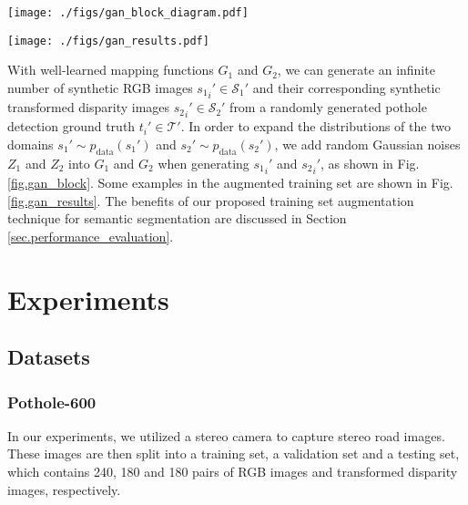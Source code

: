 \documentclass[runningheads]{llncs}
\begin{document}
\begin{figure*}[t]
    \centering
    \texttt{[image: ./figs/gan\_block\_diagram.pdf]}
    \caption{Adversarial domain adaptation for training set augmentation.}
    \label{fig.gan_block}
\end{figure*}

\begin{figure*}[t]
    \centering
    \texttt{[image: ./figs/gan\_results.pdf]}
    \caption{Examples of training set augmentation results: (a) randomly created pothole detection ground truth; (b) generated RGB images; and (c) generated transformed disparity images.}
    \label{fig.gan_results}
\end{figure*}

With well-learned mapping functions $G_1$ and $G_2$, we can generate an infinite number of synthetic RGB images ${{s_1}_i}'\in\mathcal{S}_1'$ and their corresponding synthetic transformed disparity images ${{s_2}_i}'\in\mathcal{S}_2'$ from a randomly generated pothole detection ground truth $t_i'\in\mathcal{T}'$. In order to expand the distributions of the two domains ${s_1}'\sim p_\text{data}({s_1}')$ and ${s_2}'\sim p_\text{data}({s_2}')$, we add random Gaussian noises $Z_1$ and $Z_2$ into $G_1$ and $G_2$ when generating ${{s_1}_i}'$ and ${{s_2}_i}'$, as shown in Fig. \ref{fig.gan_block}. Some examples in the augmented training set are shown in Fig. \ref{fig.gan_results}. The benefits of our proposed training set augmentation technique for semantic segmentation are discussed in Section \ref{sec.performance_evaluation}.


\section{Experiments}
\label{sec.exp}

\subsection{Datasets}
\label{sec.datasets}

\subsubsection{Pothole-600}
In our experiments, we utilized a stereo camera to capture stereo road images. These images are then split into a training set, a validation set and a testing set, which contains 240, 180 and 180 pairs of RGB images and transformed disparity images, respectively.
\end{document}
